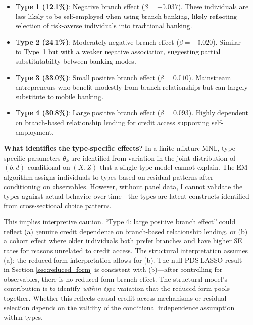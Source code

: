 \documentclass[12pt]{article}
\begin{document}
\begin{itemize}
    \item \textbf{Type 1 (12.1\%)}: Negative branch effect ($\beta = -0.037$). These individuals are less likely to be self-employed when using branch banking, likely reflecting selection of risk-averse individuals into traditional banking.

    \item \textbf{Type 2 (24.1\%)}: Moderately negative branch effect ($\beta = -0.020$). Similar to Type~1 but with a weaker negative association, suggesting partial substitutability between banking modes.

    \item \textbf{Type 3 (33.0\%)}: Small positive branch effect ($\beta = 0.010$). Mainstream entrepreneurs who benefit modestly from branch relationships but can largely substitute to mobile banking.

    \item \textbf{Type 4 (30.8\%)}: Large positive branch effect ($\beta = 0.093$). Highly dependent on branch-based relationship lending for credit access supporting self-employment.
\end{itemize}

\textbf{What identifies the type-specific effects?} In a finite mixture MNL, type-specific parameters $\theta_k$ are identified from variation in the joint distribution of $(b,d)$ conditional on $(X,Z)$ that a single-type model cannot explain. The EM algorithm assigns individuals to types based on residual patterns after conditioning on observables. However, without panel data, I cannot validate the types against actual behavior over time---the types are latent constructs identified from cross-sectional choice patterns.

This implies interpretive caution. ``Type 4: large positive branch effect'' could reflect (a) genuine credit dependence on branch-based relationship lending, or (b) a cohort effect where older individuals both prefer branches and have higher SE rates for reasons unrelated to credit access. The structural interpretation assumes (a); the reduced-form interpretation allows for (b). The null PDS-LASSO result in Section \ref{sec:reduced_form} is consistent with (b)---after controlling for observables, there is no reduced-form branch effect. The structural model's contribution is to identify \textit{within-type} variation that the reduced form pools together. Whether this reflects causal credit access mechanisms or residual selection depends on the validity of the conditional independence assumption within types.
\end{document}
